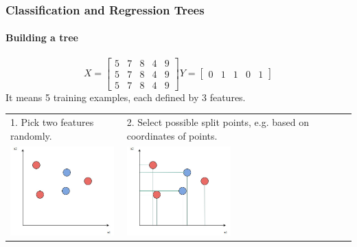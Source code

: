 \begin{frame}
	\frametitle{Classification and Regression Trees}
		\framesubtitle{Building a tree}
		\[
		X=
		\left[ {\begin{array}{ccccc}
		5 & 7 & 8 & 4 & 9\\
		5 & 7 & 8 & 4 & 9\\
		5 & 7 & 8 & 4 & 9
		\end{array} } \right]
		Y=
		\left[ {\begin{array}{ccccc}
		0 & 1 & 1 & 0 & 1
		\end{array} } \right]
		\] 
		It means 5 training examples, each defined by 3 features.
		\begin{center}
		\begin{tabular}{m{5cm} m{5cm}}
		1. Pick two features randomly.
		&
		2. Select possible split points, e.g. based on coordinates of points. \\
		\includegraphics[width=4cm]{./figures/macierz1}
		&
		\includegraphics[width=4cm]{./figures/macierz2}
		\\
		\end{tabular}
		\end{center}
		
\end{frame}

